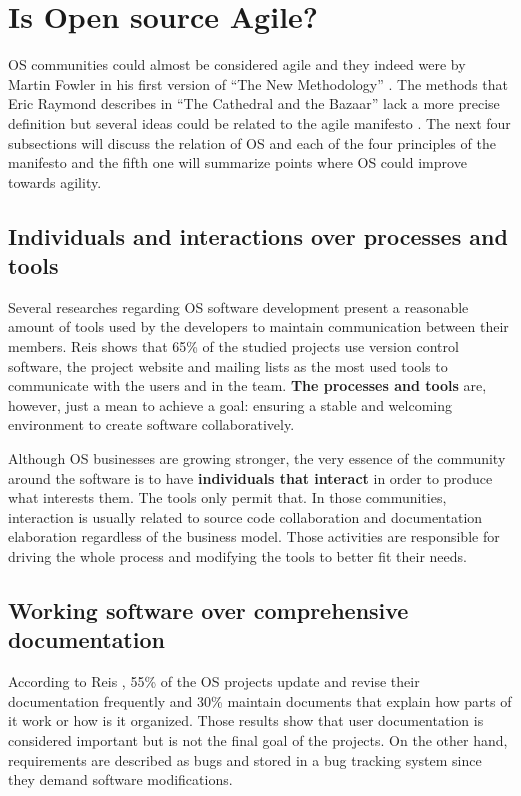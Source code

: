 \chapter{Is Open source Agile?}
\label{cap:foss}

OS communities could almost be considered agile and they indeed were
by Martin Fowler in his first version of ``The New Methodology''
\cite{Fowler00orig}. The methods that Eric Raymond describes in ``The
Cathedral and the Bazaar'' \cite{Raymond1999} lack a more precise
definition but several ideas could be related to the agile manifesto
\cite{AgileManifesto}. The next four subsections will discuss the
relation of OS and each of the four principles of the manifesto and
the fifth one will summarize points where OS could improve towards
agility.

\section{Individuals and interactions over processes and tools}
\label{sec:first-princ}

Several researches regarding OS software development present a
reasonable amount of tools used by the developers to maintain
communication between their members. Reis \cite{Reis2003} shows that
65\% of the studied projects use version control software, the project
website and mailing lists as the most used tools to communicate with
the users and in the team. \textbf{The processes and tools} are,
however, just a mean to achieve a goal: ensuring a stable and
welcoming environment to create software collaboratively.

Although OS businesses are growing stronger, the very essence of the
community around the software is to have \textbf{individuals that
  interact} in order to produce what interests them. The tools only
permit that. In those communities, interaction is usually related to
source code collaboration and documentation elaboration regardless of
the business model. Those activities are responsible for driving the
whole process and modifying the tools to better fit their needs.

\section{Working software over comprehensive documentation}
\label{sec:second-princ}

According to Reis \cite{Reis2003}, 55\% of the OS projects update and
revise their documentation frequently and 30\% maintain documents that
explain how parts of it work or how is it organized. Those results
show that user documentation is considered important but is not the
final goal of the projects. On the other hand, requirements are
described as bugs and stored in a bug tracking system since they
demand software modifications.

